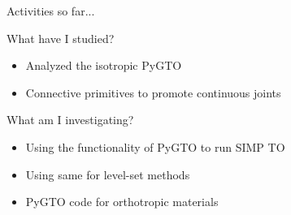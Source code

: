 \documentclass{beamer}
\begin{document}
\begin{frame} {Activities so far...}
    \begin{block}{What have I studied?}
        \begin{itemize}
            \item Analyzed the isotropic PyGTO
            \item Connective primitives to promote continuous joints
        \end{itemize}
    \end{block}
    \begin{block}{What am I investigating?}
        \begin{itemize}
            \item Using the functionality of PyGTO to run SIMP TO
            \item Using same for level-set methods
            \item PyGTO code for orthotropic materials
        \end{itemize}
    \end{block}
\end{frame}
\end{document}
